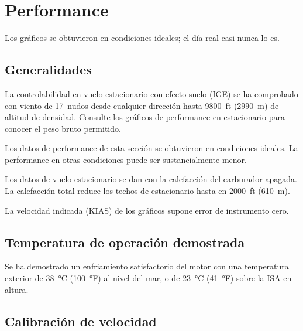 \chapter{Performance}
\label{cap:performance}

\opening{Los gráficos se obtuvieron en condiciones ideales; el día real casi nunca lo es.}

\section{Generalidades}

La controlabilidad en vuelo estacionario con efecto suelo (IGE) se ha comprobado con viento de 17~nudos desde cualquier dirección hasta 9800~ft (2990~m) de altitud de densidad. Consulte los gráficos de performance en estacionario para conocer el peso bruto permitido.

\begin{precaucion}
Los datos de performance de esta sección se obtuvieron en condiciones ideales. La performance en otras condiciones puede ser sustancialmente menor.
\end{precaucion}

\begin{nota}
Los datos de vuelo estacionario se dan con la calefacción del carburador apagada. La calefacción total reduce los techos de estacionario hasta en 2000~ft (610~m).
\end{nota}

La velocidad indicada (KIAS) de los gráficos supone error de instrumento cero.

\section{Temperatura de operación demostrada}

Se ha demostrado un enfriamiento satisfactorio del motor con una temperatura exterior de 38~°C (100~°F) al nivel del mar, o de 23~°C (41~°F) sobre la ISA en altura.

\section{Calibración de velocidad}


